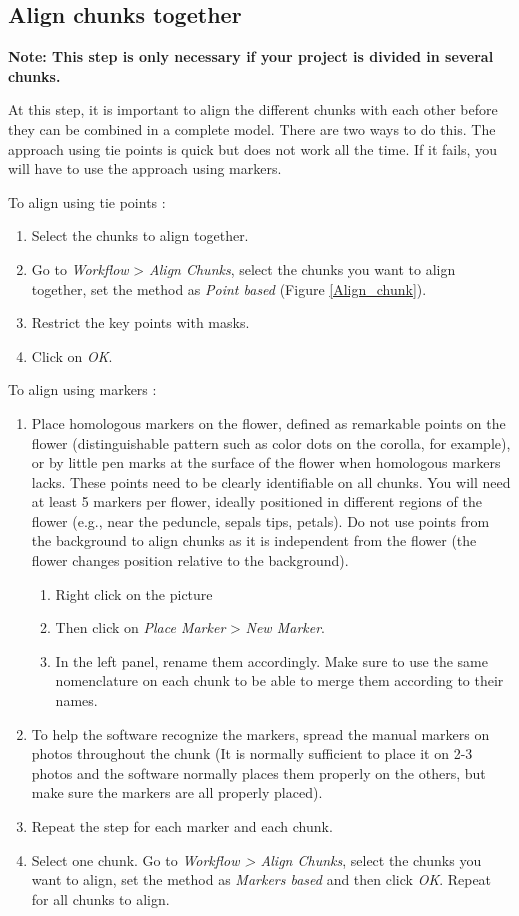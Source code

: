 \documentclass[10pt,letter,english]{article}
\begin{document}
\subsection{Align chunks together}

\noindent \textbf{Note: This step is only necessary if your project is divided in several chunks.}


At this step, it is important to align the different chunks with each other before they can be combined in a complete model. There are two ways to do this. The approach using tie points is quick but does not work all the time. If it fails, you will have to use the approach using markers.


\noindent To align using tie points :
\begin{enumerate}
    \item Select the chunks to align together.
    \item Go to \textit{Workflow} > \textit{Align Chunks}, select the chunks you want to align together, set the method as \textit{Point based} (Figure \ref{Align_chunk}).
    \item Restrict the key points with masks.
    \item Click on \textit{OK}.
\end{enumerate}


\noindent To align using markers :
\begin{enumerate}
    \item Place homologous markers on the flower, defined as remarkable points on the flower (distinguishable pattern such as color dots on the corolla, for example), or by little pen marks at the surface of the flower when homologous markers lacks. These points need to be clearly identifiable on all chunks. You will need at least 5 markers per flower, ideally positioned in different regions of the flower (e.g., near the peduncle, sepals tips, petals). Do not use points from the background to align chunks as it is independent from the flower (the flower changes position relative to the background).
    \begin{enumerate}
        \item Right click on the picture
        \item Then click on \textit{Place Marker} > \textit{New Marker}.
        \item In the left panel, rename them accordingly. Make sure to use the same nomenclature on each chunk to be able to merge them according to their names.
    \end{enumerate}
    \item To help the software recognize the markers, spread the manual markers on photos throughout the chunk (It is normally sufficient to place it on 2-3 photos and the software normally places them properly on the others, but make sure the markers are all properly placed).
    \item Repeat the step for each marker and each chunk. 
    \item Select one chunk. Go to \textit{Workflow > Align Chunks}, select the chunks you want to align, set the method as \textit{Markers based} and then click \textit{OK}. Repeat for all chunks to align.
\end{enumerate}
\end{document}
